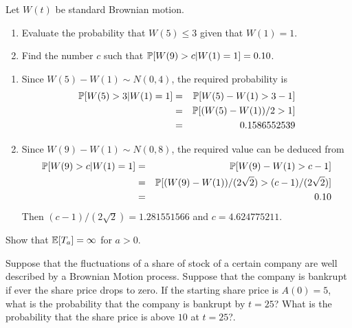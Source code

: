 \begin{problem}
 Let $ W(t) $ be standard Brownian motion.
  \begin{enumerate}
      \item
          Evaluate the probability that $ W(5) \le 3 $ given that $
          W(1) = 1 $.
      \item
          Find the number $ c $ such that $ \P[ W(9) > c | W(1)
          =1 ] = 0.10 $.
  \end{enumerate}

\end{problem} 
\begin{solution} 

\begin{enumerate}
    \item
        Since $ W(5) - W(1) \sim N(0,4) $, the required
        probability is
        \begin{eqnarray*}
            \P[ W(5) > 3 | W(1) = 1] &=& \P[ W(5) - W(1) > 3 -
            1] \\
            &=& \P[ ( W(5) - W(1))/2 > 1] \\
            &=& 0.1586552539
        \end{eqnarray*}
    \item
        Since $ W(9) - W(1) \sim N(0,8) $, the required value
        can be deduced from
        \begin{eqnarray*}
            \P[ W(9) > c | W(1) = 1] &=& \P[ W(9) - W(1) > c -
            1] \\
            &=& \P[ ( W(9) - W(1))/(2\sqrt{2}) > (c -1)/(2\sqrt
            {2}) ] \\
            &=& 0.10
        \end{eqnarray*}
        Then $ (c -1)/(2 \sqrt{2}) = 1.281551566 $ and $ c=
        4.624775211 $.
\end{enumerate}
\end{solution}

\begin{problem}
  Show that \( \E[T_a] = \infty \) for $ a > 0 $.
\end{problem} 
\begin{solution} 

\end{solution}

\begin{problem}
  Suppose that the fluctuations of a share of stock of a certain
  company are well described by a Brownian Motion process. Suppose
  that the company is bankrupt if ever the share price drops to
  zero.  If the starting share price is $ A(0) = 5 $, what is the
  probability that the company is bankrupt by $ t = 25 $?  What is
  the probability that the share price is above $ 10 $ at $ t = 25$?.
  
\end{problem} 
\begin{solution} 

\end{solution}

